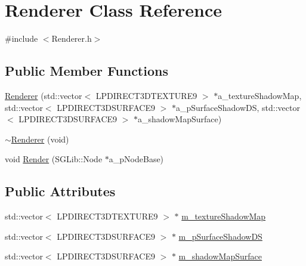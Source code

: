 \hypertarget{class_renderer}{
\section{Renderer Class Reference}
\label{class_renderer}
}


{\ttfamily \#include $<$Renderer.h$>$}\subsection*{Public Member Functions}
\begin{DoxyCompactItemize}
\item 
\hyperlink{class_renderer_a9988ec7dfd7fb3c9c3920576264dbc88}{Renderer} (std::vector$<$ LPDIRECT3DTEXTURE9 $>$ $\ast$a\_\-textureShadowMap, std::vector$<$ LPDIRECT3DSURFACE9 $>$ $\ast$a\_\-pSurfaceShadowDS, std::vector$<$ LPDIRECT3DSURFACE9 $>$ $\ast$a\_\-shadowMapSurface)
\item 
\hyperlink{class_renderer_a99308d3d72cd9408dd8faa2136dec547}{$\sim$Renderer} (void)
\item 
void \hyperlink{class_renderer_ac97416b1b1a1ac05343affadd0a82f5a}{Render} (SGLib::Node $\ast$a\_\-pNodeBase)
\end{DoxyCompactItemize}
\subsection*{Public Attributes}
\begin{DoxyCompactItemize}
\item 
std::vector$<$ LPDIRECT3DTEXTURE9 $>$ $\ast$ \hyperlink{class_renderer_a5a486c35dea90ef50d63e8adbe8c22da}{m\_\-textureShadowMap}
\item 
std::vector$<$ LPDIRECT3DSURFACE9 $>$ $\ast$ \hyperlink{class_renderer_ab086d49d8f8083de6a6fb30116808719}{m\_\-pSurfaceShadowDS}
\item 
std::vector$<$ LPDIRECT3DSURFACE9 $>$ $\ast$ \hyperlink{class_renderer_a43f8f987b555a905a0674246e3f21cec}{m\_\-shadowMapSurface}
\end{DoxyCompactItemize}


